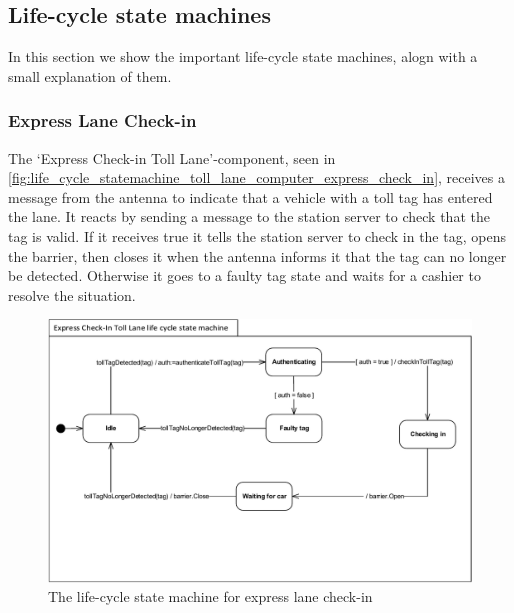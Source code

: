 \subsection*{Life-cycle state machines}
In this section we show the important life-cycle state machines, alogn with a small explanation of them.
\subsubsection*{Express Lane Check-in}
The ‘Express Check-in Toll Lane’-component, seen in \autoref{fig:life_cycle_statemachine_toll_lane_computer_express_check_in}, receives a message from the antenna to indicate that a vehicle with a toll tag has entered the lane. It reacts by sending a message to the station server to check that the tag is valid. If it receives true it tells the station server to check in the tag, opens the barrier, then closes it when the antenna informs it that the tag can no longer be detected.  Otherwise it goes to a faulty tag state and waits for a cashier to resolve the situation. 
\begin{figure}[H]
\centering
\includegraphics[width=0.7\linewidth]{img/behaviour_state_machines/life_cycle_state_machines/life_cycle_statemachine_toll_lane_computer_express_check_in}
\caption{The life-cycle state machine for express lane check-in}
\label{fig:life_cycle_statemachine_toll_lane_computer_express_check_in}
\end{figure}

